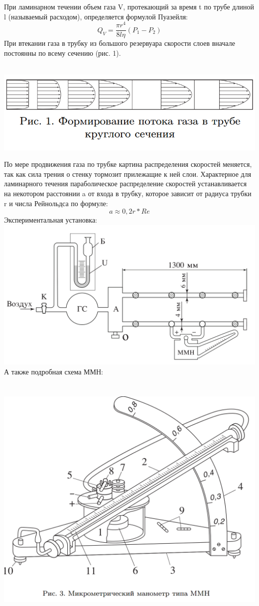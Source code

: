 \documentclass[11pt]{article}
\begin{document}
При ламинарном течении объем газа V, протекающий за время t по трубе длиной l (называемый расходом), определяется формулой Пуазейля: $$Q_V=\frac{\pi r^4}{8l\eta}(P_1-P_2)$$
При	втекании	газа	в	
трубку	из большого резервуара скорости слоев вначале постоянны по всему сечению (рис. 1). 
\begin{center}
\ \includegraphics[scale=0.5]{pic1.png}
\end{center}
\indent
\indent По мере продвижения  газа по	трубке	
картина распределения скоростей меняется, так как сила трения о стенку тормозит прилежащие к ней слои. Характерное для ламинарного	
течения параболическое распределение скоростей устанавливается на	
некотором расстоянии a от входа в трубку, которое зависит от радиуса трубки r и числа Рейнольдса по формуле: $$a\approx0,2r*Re$$
\newpage
Экспериментальная установка:
\\
\includegraphics[scale=0.6]{pic2.png} \\
А также подробная схема ММН:
\\
\ \\ \
\includegraphics[scale=0.4]{pic3.png}
\end{document}
